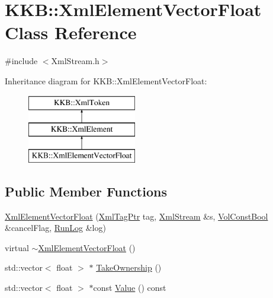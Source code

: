 \hypertarget{class_k_k_b_1_1_xml_element_vector_float}{}\section{K\+KB\+:\+:Xml\+Element\+Vector\+Float Class Reference}
\label{class_k_k_b_1_1_xml_element_vector_float}


{\ttfamily \#include $<$Xml\+Stream.\+h$>$}

Inheritance diagram for K\+KB\+:\+:Xml\+Element\+Vector\+Float\+:\begin{figure}[H]
\begin{center}
\leavevmode
\includegraphics[height=3.000000cm]{class_k_k_b_1_1_xml_element_vector_float}
\end{center}
\end{figure}
\subsection*{Public Member Functions}
\begin{DoxyCompactItemize}
\item 
\hyperlink{class_k_k_b_1_1_xml_element_vector_float_adc7ad31ae59d66c12d9b57466d178289}{Xml\+Element\+Vector\+Float} (\hyperlink{namespace_k_k_b_a9253a3ea8a5da18ca82be4ca2b390ef0}{Xml\+Tag\+Ptr} tag, \hyperlink{class_k_k_b_1_1_xml_stream}{Xml\+Stream} \&s, \hyperlink{namespace_k_k_b_a7d390f568e2831fb76b86b56c87bf92f}{Vol\+Const\+Bool} \&cancel\+Flag, \hyperlink{class_k_k_b_1_1_run_log}{Run\+Log} \&log)
\item 
virtual \hyperlink{class_k_k_b_1_1_xml_element_vector_float_ae122e99121fa49e27b8721396330be0f}{$\sim$\+Xml\+Element\+Vector\+Float} ()
\item 
std\+::vector$<$ float $>$ $\ast$ \hyperlink{class_k_k_b_1_1_xml_element_vector_float_a9811ab5d1777c2b6e9c3fb90f7e909bd}{Take\+Ownership} ()
\item 
std\+::vector$<$ float $>$ $\ast$const \hyperlink{class_k_k_b_1_1_xml_element_vector_float_a0a65b4560ef7b3199daa78f4125fa608}{Value} () const 
\end{DoxyCompactItemize}
